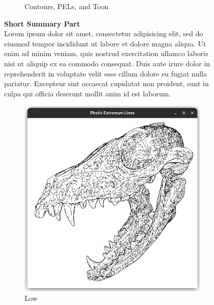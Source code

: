 \documentclass[9pt,fleqn,twoside,twocolumn]{stdglobal}
\begin{document}
\begin{figure}
\begin{subfigure}[b]{0.24\textwidth}
        \caption{Contours, PELs, and Toon}
      \end{subfigure}%
      \caption{\textbf{Short Summary Part}\\
      Lorem ipsum dolor sit amet, consectetur adipisicing elit, sed do eiusmod
      tempor incididunt ut labore et dolore magna aliqua. Ut enim ad minim veniam,
      quis nostrud exercitation ullamco laboris nisi ut aliquip ex ea commodo
      consequat. Duis aute irure dolor in reprehenderit in voluptate velit esse
      cillum dolore eu fugiat nulla pariatur. Excepteur sint occaecat cupidatat non
      proident, sunt in culpa qui officia deserunt mollit anim id est laborum.}
    \end{figure}

  \begin{figure}
    \centering
    \begin{subfigure}[b]{0.49\linewidth}
      \centering
      \includegraphics[width=\textwidth,trim={15px 15 15 50},clip]{images/fox-skull-threshold-low.png}
      \caption{Low}
    \end{subfigure}
    \begin{subfigure}[b]{0.49\linewidth}
      \centering

\end{subfigure}
\end{figure}
\end{document}

